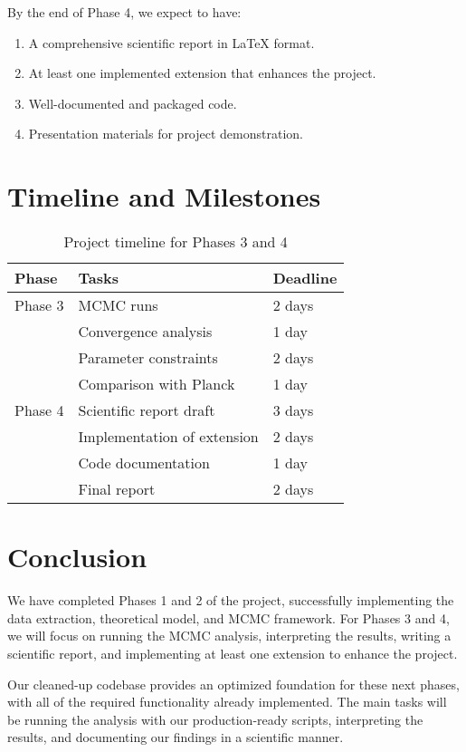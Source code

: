 \documentclass[11pt]{article}
\begin{document}
By the end of Phase 4, we expect to have:

\begin{enumerate}
    \item A comprehensive scientific report in LaTeX format.
    \item At least one implemented extension that enhances the project.
    \item Well-documented and packaged code.
    \item Presentation materials for project demonstration.
\end{enumerate}

\section{Timeline and Milestones}

\begin{table}[h]
\centering
\begin{tabular}{|l|l|l|}
\hline
\textbf{Phase} & \textbf{Tasks} & \textbf{Deadline} \\
\hline
Phase 3 & MCMC runs & 2 days \\
        & Convergence analysis & 1 day \\
        & Parameter constraints & 2 days \\
        & Comparison with Planck & 1 day \\
\hline
Phase 4 & Scientific report draft & 3 days \\
        & Implementation of extension & 2 days \\
        & Code documentation & 1 day \\
        & Final report & 2 days \\
\hline
\end{tabular}
\caption{Project timeline for Phases 3 and 4}
\end{table}

\section{Conclusion}

We have completed Phases 1 and 2 of the project, successfully implementing the data extraction, theoretical model, and MCMC framework. For Phases 3 and 4, we will focus on running the MCMC analysis, interpreting the results, writing a scientific report, and implementing at least one extension to enhance the project.

Our cleaned-up codebase provides an optimized foundation for these next phases, with all of the required functionality already implemented. The main tasks will be running the analysis with our production-ready scripts, interpreting the results, and documenting our findings in a scientific manner.
\end{document}
